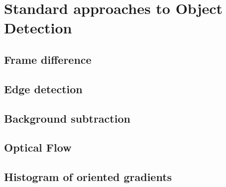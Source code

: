 \chapter{Standard approaches to Object Detection}

\section*{Frame difference}
\section{Edge detection}
\section*{Background subtraction}
\section{Optical Flow}
\section{Histogram of oriented gradients}

